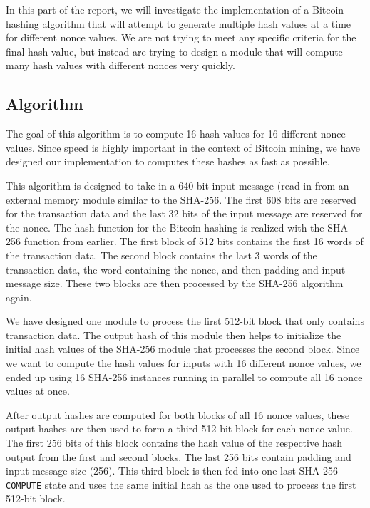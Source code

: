 \documentclass{article}
\begin{document}
In this part of the report, we will investigate the implementation of a Bitcoin hashing algorithm that will attempt to generate multiple hash values at a time for different nonce values. We are not trying to meet any specific criteria for the final hash value, but instead are trying to design a module that will compute many hash values with different nonces very quickly.

\subsection{Algorithm}

The goal of this algorithm is to compute 16 hash values for 16 different nonce values. Since speed is highly important in the context of Bitcoin mining, we have designed our implementation to computes these hashes as fast as possible.

This algorithm is designed to take in a 640-bit input message (read in from an external memory module similar to the SHA-256. The first 608 bits are reserved for the transaction data and the last 32 bits of the input message are reserved for the nonce. The hash function for the Bitcoin hashing is realized with the SHA-256 function from earlier. The first block of 512 bits contains the first 16 words of the transaction data. The second block contains the last 3 words of the transaction data, the word containing the nonce, and then padding and input message size. These two blocks are then processed by the SHA-256 algorithm again. 

We have designed one module to process the first 512-bit block that only contains transaction data. The output hash of this module then helps to initialize the initial hash values of the SHA-256 module that processes the second block. Since we want to compute the hash values for inputs with 16 different nonce values, we ended up using 16 SHA-256 instances running in parallel to compute all 16 nonce values at once.

After output hashes are computed for both blocks of all 16 nonce values, these output hashes are then used to form a third 512-bit block for each nonce value. The first 256 bits of this block contains the hash value of the respective hash output from the first and second blocks. The last 256 bits contain padding and input message size (256). This third block is then fed into one last SHA-256 \verb|COMPUTE| state and uses the same initial hash as the one used to process the first 512-bit block.
\end{document}
